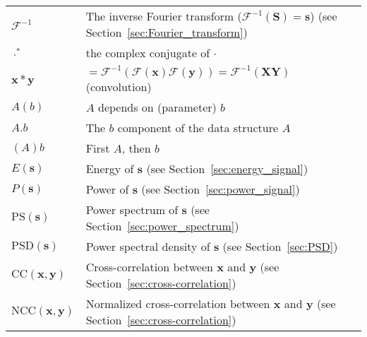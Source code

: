 \documentclass{report}%
\begin{document}
\begin{tabular}{ll}
  $\mathcal{F}^{-1}$ & The inverse Fourier transform ($\mathcal{F}^{-1}(\mathbf{S})=\mathbf{s}$)  (see Section~\ref{sec:Fourier_transform})\\
  $\cdot^*$ & the complex conjugate of $\cdot$ \\
  $\mathbf{x}*\mathbf{y}$ & $=\mathcal{F}^{-1}(\mathcal{F}(\mathbf{x})\mathcal{F}(\mathbf{y}))=\mathcal{F}^{-1}(\mathbf{X}\mathbf{Y})$ (convolution) \\
  $A(b)$ & $A$ depends on (parameter) $b$ \\
  $A.b$ & The $b$ component of the data structure $A$ \\
  $(A)b$ & First $A$, then $b$ \\
  $E(\mathbf{s})$ & Energy of $\mathbf{s}$ (see Section~\ref{sec:energy_signal}) \\
  $P(\mathbf{s})$ & Power of $\mathbf{s}$ (see Section~\ref{sec:power_signal}) \\
  $\text{PS}(\mathbf{s})$ & Power spectrum of $\mathbf{s}$ (see Section~\ref{sec:power_spectrum}) \\
  $\text{PSD}(\mathbf{s})$ & Power spectral density of $\mathbf{s}$ (see Section~\ref{sec:PSD}) \\
  $\text{CC}(\mathbf{x},\mathbf{y})$ & Cross-correlation between $\mathbf{x}$ and $\mathbf{y}$ (see Section~\ref{sec:cross-correlation}) \\
  $\text{NCC}(\mathbf{x},\mathbf{y})$ & Normalized cross-correlation between $\mathbf{x}$ and $\mathbf{y}$ (see Section~\ref{sec:cross-correlation})
\end{tabular}












\end{document}
